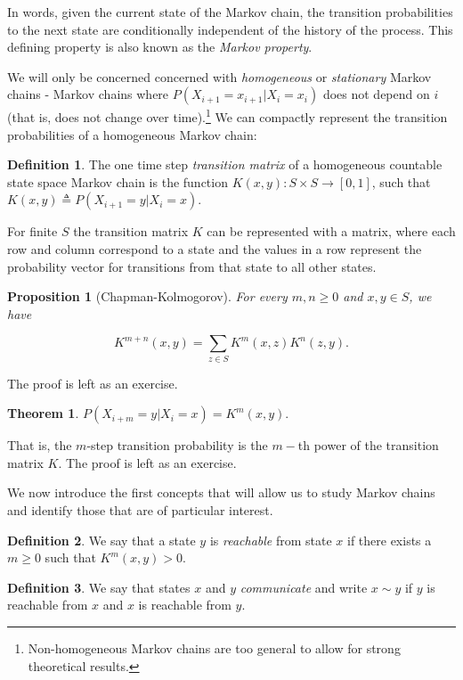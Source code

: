 \documentclass{book}
\theoremstyle{plain}%
\newtheorem{theorem}{Theorem}[section]
\newtheorem{proposition}{Proposition}[section]
\theoremstyle{definition}
\newtheorem{definition}{Definition}[section]
\newlength{\arrow}
\begin{document}
In words, given the current state of the Markov chain, the transition probabilities to the next state are conditionally independent of the history of the process. This defining property is also known as the \emph{Markov property}.

We will only be concerned concerned with \emph{homogeneous} or \emph{stationary} Markov chains - Markov chains where $P(X_{i+1} = x_{i+1}|X_{i} = x_{i})$ does not depend on $i$ (that is, does not change over time).\footnote{Non-homogeneous Markov chains are too general to allow for strong theoretical results.} We can compactly represent the transition probabilities of a homogeneous Markov chain:

\begin{definition} The one time step \emph{transition matrix} of a homogeneous countable state space Markov chain is the function $K(x,y): S \times S \rightarrow [0,1]$, such that  $K(x,y) \triangleq P(X_{i+1} = y|X_{i} = x)$.
\end{definition}

For finite $S$ the transition matrix $K$ can be represented with a matrix, where each row and column correspond to a state and the values in a row represent the probability vector for transitions from that state to all other states.

\begin{proposition}[Chapman-Kolmogorov] For every $m, n \geq 0$ and $x, y \in S$, we have 

$$K^{m+n}(x, y) = \sum_{z \in S} K^m(x,z)K^n(z,y).$$
\label{prop:chapman} 
\end{proposition}

The proof is left as an exercise.

\begin{theorem}
$P(X_{i+m} = y|X_{i} = x) = K^m(x, y).$
\label{thm:chapman}
\end{theorem}

That is, the $m$-step transition probability is the $m-$th power of the transition matrix $K$. The proof is left as an exercise.

We now introduce the first concepts that will allow us to study Markov chains and identify those that are of particular interest.

\begin{definition} We say that a state $y$ is \emph{reachable} from state $x$ if there exists a $m \geq 0$ such that $K^m(x,y) > 0$.
\end{definition}

\begin{definition} We say that states $x$ and $y$ \emph{communicate} and write $x \sim y$ if $y$ is reachable from $x$ and $x$ is reachable from $y$.
\end{definition}
\end{document}
